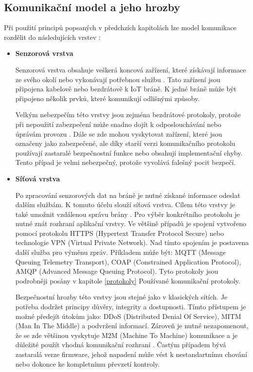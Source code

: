  \subsection{Komunikační model a jeho hrozby}
 Při použití principů popsaných v předchzích kapitolách lze model komunikace rozdělit
 do následujících vrstev \cite{iotSurvey}:
 \begin{itemize}

 \item \textbf{Senzorová vrstva}
 
 Senzorová vrstva obsahuje veškerá koncová zařízení, které získávají informace ze svého
 okolí nebo vykonávají potřebnou službu \cite{secFramework}. Tato zařízení jsou připojena
 kabelově nebo bezdrátově k IoT bráně. K jedné bráně může být připojeno několik
 prvků, které komunikují odlišnými způsoby.
 
 Velkým nebezpečím této vrstvy jsou zejména bezdrátové protokoly, protože při nepoužití
 zabezpečení může snadno dojít k odposlouchávání nebo úprávám provozu \cite{iotSurvey}.
 Dále se zde mohou vyskytovat zařízení, které jsou označeny jako zabezpečené, 
 ale díky starší verzi komunikačního protokolu používají zastaralé bezpečnostní funkce
 nebo obsahují implementační chyby. 
 Tento případ je velmi nebezpečný, protože vyvolává falešný pocit bezpečí.
 
 \item \textbf{Síťová vrstva}
 
  Po zpracování senzorových dat na bráně je nutné získané informace odeslat dalším
 službám. K tomuto účelu slouží síťová vrstva. Cílem této vrstvy je také umožnit 
 vzdálenou správu brány \cite{secFramework}. Pro výběr konkrétního protokolu je 
 nutné znát rozhraní aplikační vrstvy. Ve většině případů je  spojení vytvořeno
 pomocí protokolu HTTPS (Hypertext Transfer Protocol Secure) nebo technologie
 VPN (Virtual Private Network). Nad tímto spojením je postavena další služba pro 
 výměnu zpráv. Příkladem může být: MQTT (Message Queuing Telemetry Transport),
 COAP (Constrained Application Protocol),
 AMQP (Advanced Message Queuing Protocol). Tyto protokoly jsou podrobněji posány v 
 kapitole \ref{protokoly} Používané komunikační protokoly.
 
 Bezpečnostní hrozby této vrstvy jsou stejné jako v klasických sítích. Je potřeba
 dodržet principy důvěry, integrity a dostupnosti. Tímto přístupem je možné
 předejít útokům jako: DDoS (Distributed Denial Of Service),
 MITM (Man In The Middle) a podvržení informací. Zároveň je nutné
 nezapomenout, že se zde většinou vyskytuje M2M (Machine To Machine)
 komunikace a je důležité použít 
 vhodná komunikační rozhraní \cite{iotSurvey}. Častým případem bývá zastaralá 
 verze firmware, jehož napadení může vést k nestandartnímu chování nebo dokonce 
 ke kompletnímu převzetí kontroly. 
 

\end{itemize}
